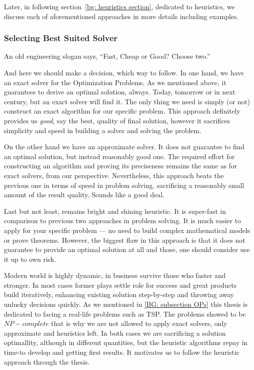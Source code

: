 Later, in following section~\ref{bg: heuristics section}, dedicated to heuristics, we discuss each of aforementioned approaches in more details including examples.


\subsubsection{Selecting Best Suited Solver}
An old engineering slogan says, ``Fast, Cheap or Good? Choose two.''

And here we should make a decision, which way to follow.
In one hand, we have an exact solver for the Optimization Problems. As we mentioned above, it guarantees to derive an optimal solution, always. Today, tomorrow or in next century, but an exact solver will find it. The only thing we need is simply (or not) construct an exact algorithm for our specific problem. This approach definitely provides us \textit{good}, say the best, quality of final solution, however it sacrifices simplicity and speed in building a solver and solving the problem.


On the other hand we have an approximate solver. It does not guarantee to find an optimal solution, but instead reasonably good one. The required effort for constructing an algorithm and proving its preciseness remains the same as for exact solvers, from our perspective. Nevertheless, this approach beats the previous one in terms of speed in problem solving, sacrificing a reasonably small amount of the result quality. Sounds like a good deal.


Last but not least, remains bright and shining heuristic. It is super-fast in comparison to previous two approaches in problem solving. It is much easier to apply for your specific problem — no need to build complex mathematical models or prove theorems. However, the biggest flaw in this approach is that it does not guarantee to provide an optimal solution at all and those, one should consider use it up to own risk.


Modern world is highly dynamic, in business survive those who faster and stronger. In most cases former plays settle role for success and great products build iteratively, enhancing existing solution step-by-step and throwing away unlucky decisions quickly. As we mentioned in \ref{BG: subsection OPs} this thesis is dedicated to facing a real-life problems such as TSP. The problems showed to be $NP-complete$ that is why we are not allowed to apply exact solvers, only approximate and heuristics left. In both cases we are sacrificing a solution optimallity, although in different quantities, but the heuristic algorithms repay in time-to develop and getting first results. It motivates us to follow the heuristic approach through the thesis.

